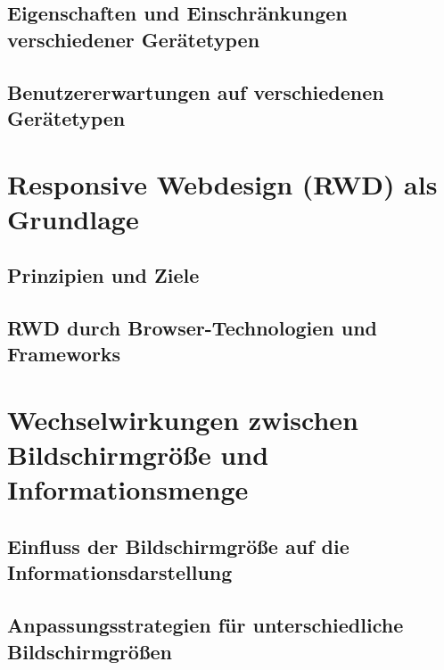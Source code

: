 \documentclass[conference,compsoc,final,a4paper]{IEEEtran}
\begin{document}
    \subsection{Eigenschaften und Einschränkungen verschiedener Gerätetypen}

    \subsection{Benutzererwartungen auf verschiedenen Gerätetypen}




    \section{Responsive Webdesign (RWD) als Grundlage}

    \subsection{Prinzipien und Ziele}

    \subsection{RWD durch Browser-Technologien und Frameworks}




    




    \section{Wechselwirkungen zwischen Bildschirmgröße und Informationsmenge}

    \subsection{Einfluss der Bildschirmgröße auf die Informationsdarstellung}

    \subsection{Anpassungsstrategien für unterschiedliche Bildschirmgrößen}
\end{document}
